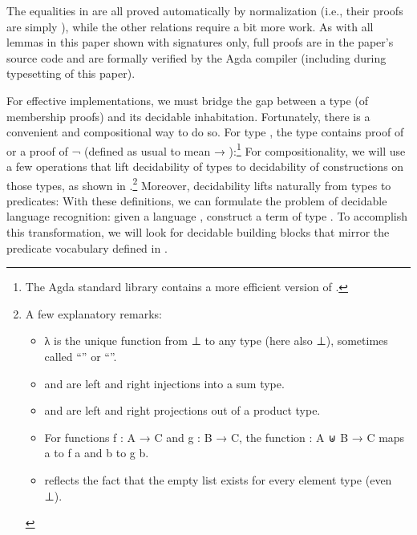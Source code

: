 \documentclass[acmsmall,screen,timestamp,anonymous,review]{acmart}
\begin{document}
The equalities in  are all proved automatically by normalization (i.e., their proofs are simply ), while the other relations require a bit more work.
As with all lemmas in this paper shown with signatures only, full proofs are in the paper's source code and are formally verified by the Agda compiler (including during typesetting of this paper).


\rnc{}

For effective implementations, we must bridge the gap between a type (of membership proofs) and its decidable inhabitation.
Fortunately, there is a convenient and compositional way to do so.
For type , the type { } contains proof of  or a proof of {\AF ¬ } (defined as usual to mean { \AS → }):\footnote{The Agda standard library contains a more efficient version of  .}
For compositionality, we will use a few operations that lift decidability of types to decidability of constructions on those types, as shown in .\footnote{%
A few explanatory remarks:
\begin{itemize}

\item {\AS λ \AS{()}} is the unique function from \AD ⊥ to any type (here also {\AD ⊥}),  sometimes called ``'' or ``''.

\item {} and  are left and right injections into a sum type.

\item {} and  are left and right projections out of a product type.

\item For functions {\AB f \AS : \AB A \AS → \AB C} and {\AB g \AS : \AB B \AS → C}, the function {\AF [ \AB f \AF , \AB g \AF ] \AS : \AB A \AF ⊎ \AB B \AS → \AB C} maps { \AB a} to {\AB f \AB a} and { \AB b} to {\AB g \AB b}.

\item {} reflects the fact that the empty list exists for every element type (even \AF ⊥).

\end{itemize}

}
Moreover, decidability lifts naturally from types to predicates:
With these definitions, we can formulate the problem of decidable language recognition: given a language , construct a term of type { }.
To accomplish this transformation, we will look for decidable building blocks that mirror the predicate vocabulary defined in .
\end{document}
